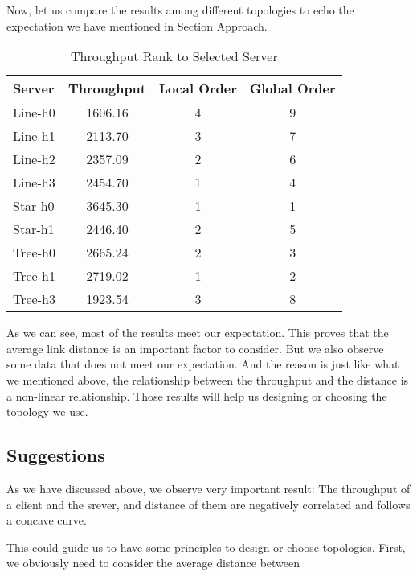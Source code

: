 Now, let us compare the results among different topologies to echo the expectation we have
mentioned in Section Approach.
\begin{table}[ht]
\centering
	\caption{Throughput Rank to Selected Server}
	\label{table:throughput}
	\begin{tabular}{|l||c|c|c|}
		\hline 
		Server   &  Throughput & Local Order & Global Order \\ \hline\hline
		Line-h0  &   1606.16  &  4   &  9 \\ \hline 
		Line-h1  &   2113.70  &  3   &  7 \\ \hline 
		Line-h2  &   2357.09  &  2   &  6 \\ \hline 
		Line-h3  &   2454.70  &  1   &  4 \\ \hline\hline 
		Star-h0  &   3645.30  &  1   &  1 \\ \hline 
        Star-h1  &   2446.40  &  2   &  5 \\ \hline\hline 
		Tree-h0  &   2665.24  &  2   &  3 \\ \hline 
		Tree-h1  &   2719.02  &  1   &  2 \\ \hline 
		Tree-h3  &   1923.54  &  3   &  8 \\ \hline 
	\end{tabular}
\end{table}
As we can see, most of the results meet our expectation. This proves that the average link 
distance is an important factor to consider. But we also observe some data that does not 
meet our expectation. And the reason is just like what we mentioned above, the relationship 
between the throughput and the distance is a non-linear relationship. Those results will help
us designing or choosing the topology we use.

\subsection{Suggestions} \label{subsec:suggestions}
As we have discussed above, we observe very important result:
The throughput of a client and the srever, and distance of them are negatively correlated 
and follows a concave curve.

This could guide us to have some principles to design or choose topologies. First, we obviously 
need to consider the average distance between 
